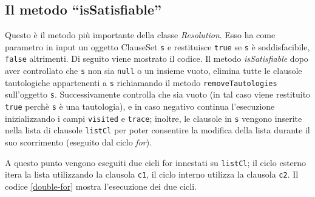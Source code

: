\documentclass[a4paper,12pt]{report}
\begin{document}
\subsection{Il metodo ``isSatisfiable''}
\label{isSat}
Questo è il metodo più importante della classe \textit{Resolution}. Esso ha come parametro in input un oggetto ClauseSet \texttt{s} e restituisce \texttt{true} se \texttt{s} è soddisfacibile, \texttt{false} altrimenti. Di seguito viene mostrato il codice. Il metodo \textit{isSatisfiable} dopo aver controllato che \texttt{s} non sia \texttt{null} o un insieme vuoto, elimina tutte le clausole tautologiche appartenenti a \texttt{s} richiamando il metodo \texttt{removeTautologies} sull'oggetto \texttt{s}. Successivamente controlla che sia vuoto (in tal caso viene restituito \texttt{true} perchè \texttt{s} è una tautologia), e in caso negativo continua l'esecuzione inizializzando i campi \texttt{visited} e \texttt{trace}; inoltre, le clausole in \texttt{s} vengono inserite nella lista di clausole \texttt{listCl} per poter consentire la modifica della lista durante il suo scorrimento (eseguito dal ciclo \textit{for}). 

A questo punto vengono eseguiti due cicli for innestati su \texttt{listCl}; il ciclo esterno itera la lista utilizzando la clausola \texttt{c1}, il ciclo interno utilizza la clausola \texttt{c2}. Il codice \ref{double-for} mostra l'esecuzione dei due cicli. 
\end{document}
